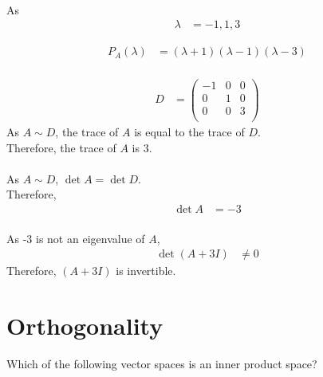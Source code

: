 \documentclass[fleqn, a4paper, draft]{amsart}
\makeatletter
\def\section{\@startsection{section}{1}%
	\z@{.7\linespacing\@plus\linespacing}{.5\linespacing}%
	{\normalfont\scshape}}%
\theoremstyle{definition}
\theoremstyle{theorem}
\theoremstyle{remark}
\numberwithin{corollary}{theorem}
\numberwithin{equation}{theorem}
\makeatother
\begin{document}
\subsection{}

As
\begin{align*}
	\lambda &= -1, 1, 3
\end{align*}

\begin{align*}
	P_A(\lambda) &= (\lambda + 1) (\lambda - 1) (\lambda - 3)
\end{align*}

\subsection{}

\begin{align*}
	D &= 
		\begin{pmatrix}
			-1 & 0 & 0\\
			0 & 1 & 0\\
			0 & 0 & 3\\
		\end{pmatrix}
\end{align*}
As $A \sim D$, the trace of $A$ is equal to the trace of $D$.\\
Therefore, the trace of $A$ is 3.

\subsection{}

As $A \sim D$, $\det A = \det D$.\\
Therefore,
\begin{align*}
	\det A &= -3
\end{align*}

\subsection{}

As -3 is not an eigenvalue of $A$,
\begin{align*}
	\det(A + 3I) &\neq 0
\end{align*}
Therefore, $(A + 3I)$ is invertible.

\part{Orthogonality}

\section{Which of the following vector spaces is an inner product space?}
\end{document}
